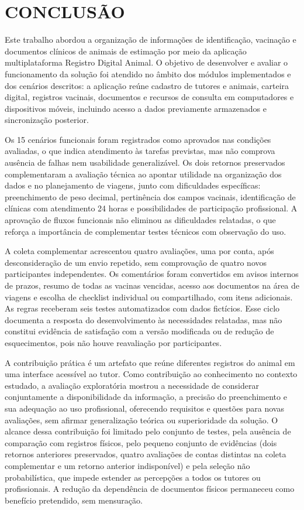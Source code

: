 \documentclass{UNESC}
\begin{document}
\section{CONCLUSÃO}

Este trabalho abordou a organização de informações de identificação, vacinação e documentos clínicos de animais de estimação por meio da aplicação multiplataforma Registro Digital Animal. O objetivo de desenvolver e avaliar o funcionamento da solução foi atendido no âmbito dos módulos implementados e dos cenários descritos: a aplicação reúne cadastro de tutores e animais, carteira digital, registros vacinais, documentos e recursos de consulta em computadores e dispositivos móveis, incluindo acesso a dados previamente armazenados e sincronização posterior.

Os 15 cenários funcionais foram registrados como aprovados nas condições avaliadas, o que indica atendimento às tarefas previstas, mas não comprova ausência de falhas nem usabilidade generalizável. Os dois retornos preservados complementaram a avaliação técnica ao apontar utilidade na organização dos dados e no planejamento de viagens, junto com dificuldades específicas: preenchimento de peso decimal, pertinência dos campos vacinais, identificação de clínicas com atendimento 24 horas e possibilidades de participação profissional. A aprovação de fluxos funcionais não eliminou as dificuldades relatadas, o que reforça a importância de complementar testes técnicos com observação do uso.

A coleta complementar acrescentou quatro avaliações, uma por conta, após desconsideração de um envio repetido, sem comprovação de quatro novos participantes independentes. Os comentários foram convertidos em avisos internos de prazos, resumo de todas as vacinas vencidas, acesso aos documentos na área de viagens e escolha de checklist individual ou compartilhado, com itens adicionais. As regras receberam seis testes automatizados com dados fictícios. Esse ciclo documenta a resposta do desenvolvimento às necessidades relatadas, mas não constitui evidência de satisfação com a versão modificada ou de redução de esquecimentos, pois não houve reavaliação por participantes.

A contribuição prática é um artefato que reúne diferentes registros do animal em uma interface acessível ao tutor. Como contribuição ao conhecimento no contexto estudado, a avaliação exploratória mostrou a necessidade de considerar conjuntamente a disponibilidade da informação, a precisão do preenchimento e sua adequação ao uso profissional, oferecendo requisitos e questões para novas avaliações, sem afirmar generalização teórica ou superioridade da solução. O alcance dessa contribuição foi limitado pelo conjunto de testes, pela ausência de comparação com registros físicos, pelo pequeno conjunto de evidências (dois retornos anteriores preservados, quatro avaliações de contas distintas na coleta complementar e um retorno anterior indisponível) e pela seleção não probabilística, que impede estender as percepções a todos os tutores ou profissionais. A redução da dependência de documentos físicos permaneceu como benefício pretendido, sem mensuração.
\end{document}
